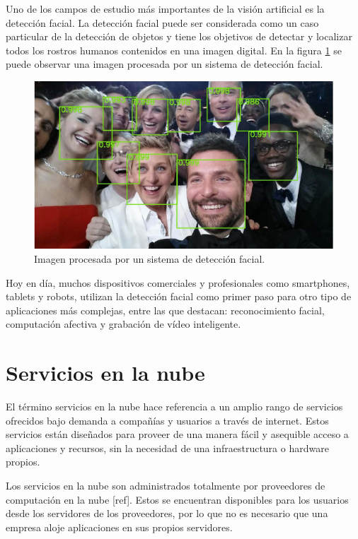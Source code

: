 Uno de los campos de estudio más importantes de la visión artificial es la detección facial. La detección facial puede ser considerada como un caso particular de la detección de objetos y tiene los objetivos de detectar y localizar todos los rostros humanos contenidos en una imagen digital. En la figura \ref{fig:mv_fd} se puede observar una imagen procesada por un sistema de detección facial.

\begin{figure}[h]
	\centering
	\includegraphics[scale=0.5]{./Figures/mv_fd.jpeg}
	\caption{Imagen procesada por un sistema de detección facial.}
	\label{fig:mv_fd}
\end{figure}

Hoy en día, muchos dispositivos comerciales y profesionales como smartphones, tablets y robots, utilizan la detección facial como primer paso para otro tipo de aplicaciones más complejas, entre las que destacan: reconocimiento facial, computación afectiva y grabación de vídeo inteligente.

\section{Servicios en la nube}
El término servicios en la nube hace referencia a un amplio rango de servicios ofrecidos bajo demanda a compañías y usuarios a través de internet. Estos servicios están diseñados para proveer de una manera fácil y asequible acceso a aplicaciones y recursos, sin la necesidad de una infraestructura o hardware propios.

Los servicios en la nube son administrados totalmente por proveedores de computación en la nube [ref]. Estos se encuentran disponibles para los usuarios desde los servidores de los proveedores, por lo que no es necesario que una empresa aloje aplicaciones en sus propios servidores.

